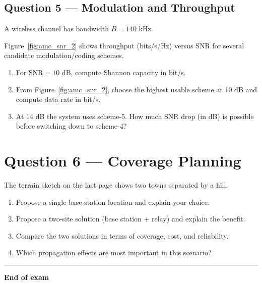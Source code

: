 \documentclass[11pt,a4paper]{article}
\begin{document}
\subsection*{Question 5 --- Modulation and Throughput}
A wireless channel has bandwidth $B = 140$ kHz.

Figure~\ref{fig:amc_snr_2} shows throughput (bits/s/Hz) versus SNR for several candidate modulation/coding schemes.

\FloatBarrier

\begin{enumerate}[label=\alph*)]
    \item For $\mathrm{SNR}=10$ dB, compute Shannon capacity in bit/s.
    \item From Figure~\ref{fig:amc_snr_2}, choose the highest usable scheme at 10 dB and compute data rate in bit/s.
    \item At 14 dB the system uses scheme-5. How much SNR drop (in dB) is possible before switching down to scheme-4?
\end{enumerate}

\section*{Question 6 --- Coverage Planning}
The terrain sketch on the last page shows two towns separated by a hill.

\begin{enumerate}[label=\alph*)]
\item Propose a single base-station location and explain your choice.
\item Propose a two-site solution (base station + relay) and explain the benefit.
\item Compare the two solutions in terms of coverage, cost, and reliability.
\item Which propagation effects are most important in this scenario?
\end{enumerate}

\vspace{0.6cm}
\hrule
\vspace{0.3cm}
\textbf{End of exam}


\clearpage
\label{LastPage}
\end{document}
